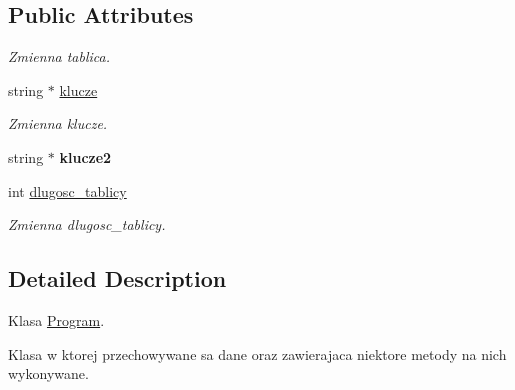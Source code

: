 \subsection*{Public Attributes}
\begin{DoxyCompactItemize}
\item 
\begin{tabbing}
xx\=xx\=xx\=xx\=xx\=xx\=xx\=xx\=xx\=\kill
union \{\\
\hypertarget{union_tablica_1_1@0_a15feeb49d1b632313b0f85102261038d}{\>string $\ast$ {\bfseries napisy}\\
\hypertarget{union_tablica_1_1@0_a1eb24dfce133308650c2deae3d92fb8a}{\>int $\ast$ {\bfseries tablica}\\
\}; \\

\end{tabbing}\begin{DoxyCompactList}\small\item\em Zmienna tablica. \end{DoxyCompactList}\item 
string $\ast$ \hyperlink{class_tablica_a86dbdede5dfd94c3ff34e35213ba4ff2}{klucze}
\begin{DoxyCompactList}\small\item\em Zmienna klucze. \end{DoxyCompactList}\item 
\hypertarget{class_tablica_a0041da06aff5d015c4338414bfb1d48f}{string $\ast$ {\bfseries klucze2}}\label{class_tablica_a0041da06aff5d015c4338414bfb1d48f}

\item 
int \hyperlink{class_tablica_ab0d3e4210dc8a77e0f1c75834084c077}{dlugosc\+\_\+tablicy}
\begin{DoxyCompactList}\small\item\em Zmienna dlugosc\+\_\+tablicy. \end{DoxyCompactList}\end{DoxyCompactItemize}


\subsection{Detailed Description}
Klasa \hyperlink{class_program}{Program}. 

Klasa w ktorej przechowywane sa dane oraz zawierajaca niektore metody na nich wykonywane. 

